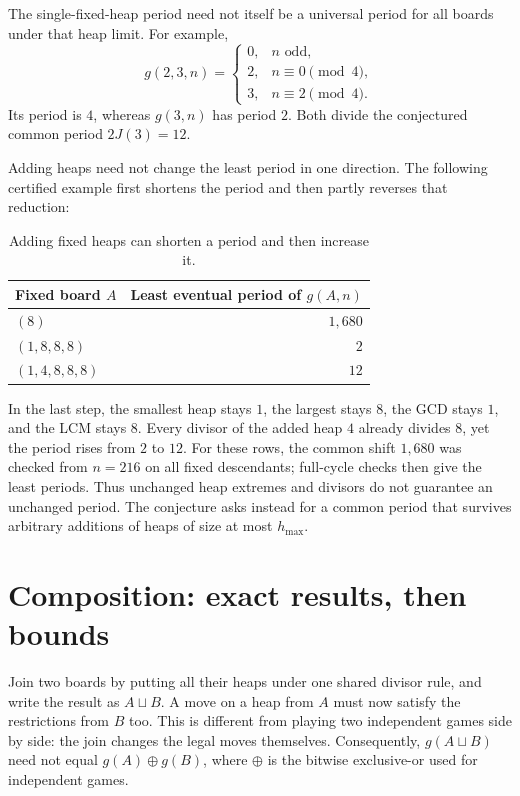 \documentclass[11pt]{article}
\newcommand{\join}{\sqcup}
\begin{document}
The single-fixed-heap period need not itself be a universal period
for all boards under that heap limit. For example,
\[
 g(2,3,n)=
 \begin{cases}
 0,&n\text{ odd},\\
 2,&n\equiv0\pmod4,\\
 3,&n\equiv2\pmod4.
 \end{cases}
\]
Its period is $4$, whereas $g(3,n)$ has period $2$. Both divide
the conjectured common period $2J(3)=12$.

Adding heaps need not change the least period in one direction.
The following certified example first shortens the period and
then partly reverses that reduction:

\begin{table}[H]
\centering
\begin{tabular}{@{}l r@{}}
\toprule
Fixed board $A$ & Least eventual period of $g(A,n)$\\
\midrule
$(8)$ & $1{,}680$\\
$(1,8,8,8)$ & $2$\\
$(1,4,8,8,8)$ & $12$\\
\bottomrule
\end{tabular}
\caption{Adding fixed heaps can shorten a period and then increase it.}
\label{tab:periodjoins}
\end{table}

In the last step, the smallest heap stays $1$, the largest stays
$8$, the GCD stays $1$, and the LCM stays $8$. Every divisor of
the added heap $4$ already divides $8$, yet the period rises from
$2$ to $12$. For these rows, the common shift $1{,}680$ was checked
from $n=216$ on all fixed descendants; full-cycle checks then give
the least periods. Thus unchanged heap extremes and divisors do
not guarantee an unchanged period. The conjecture asks instead
for a common period that survives arbitrary additions of heaps
of size at most $h_{\max}$.

\section{Composition: exact results, then bounds}
\label{sec:composition}

Join two boards by putting all their heaps under one shared divisor
rule, and write the result as $A\join B$. A move on a heap from $A$
must now satisfy the restrictions from $B$ too. This is different
from playing two independent games side by side: the join changes
the legal moves themselves.
Consequently, $g(A\join B)$ need not equal $g(A)\mathbin{\oplus}g(B)$,
where $\oplus$ is the bitwise exclusive-or used for independent games.
\end{document}

